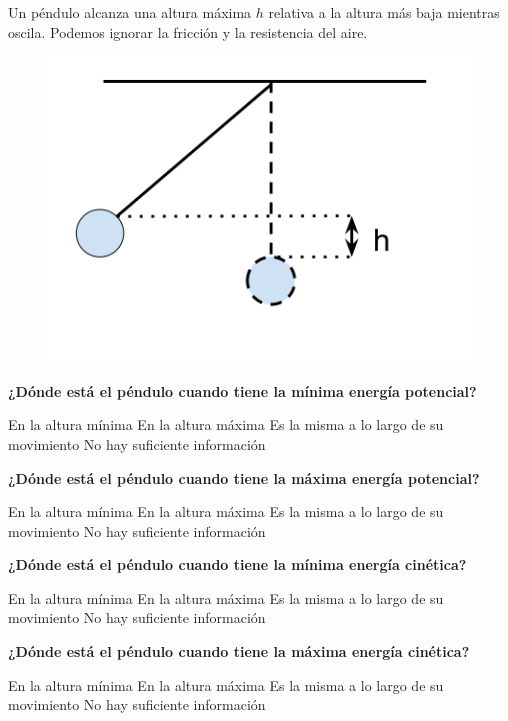 Un péndulo alcanza una altura máxima $h$ relativa a la altura más baja mientras oscila. Podemos ignorar la fricción y la resistencia del aire.


\begin{figure}[H]
    \centering
    \includegraphics[width=0.5\linewidth]{../images/6f7b57146c85d8c1c8e1fbce4d78a2d3c2fcac2a}
\end{figure}
\textbf{¿Dónde está el péndulo cuando tiene la mínima energía potencial?}

\begin{choices}
    \CorrectChoice En la altura mínima
    \choice En la altura máxima
    \choice Es la misma a lo largo de su movimiento
    \choice No hay suficiente información
\end{choices}

\textbf{¿Dónde está el péndulo cuando tiene la máxima energía potencial?}

\begin{choices}
    \choice En la altura mínima
    \CorrectChoice En la altura máxima
    \choice Es la misma a lo largo de su movimiento
    \choice No hay suficiente información
\end{choices}

\textbf{¿Dónde está el péndulo cuando tiene la mínima energía cinética?}

\begin{choices}
    \choice En la altura mínima
    \CorrectChoice En la altura máxima
    \choice Es la misma a lo largo de su movimiento
    \choice No hay suficiente información
\end{choices}
\textbf{¿Dónde está el péndulo cuando tiene la máxima energía cinética?}

\begin{choices}
    \CorrectChoice En la altura mínima
    \choice En la altura máxima
    \choice Es la misma a lo largo de su movimiento
    \choice No hay suficiente información
\end{choices}

